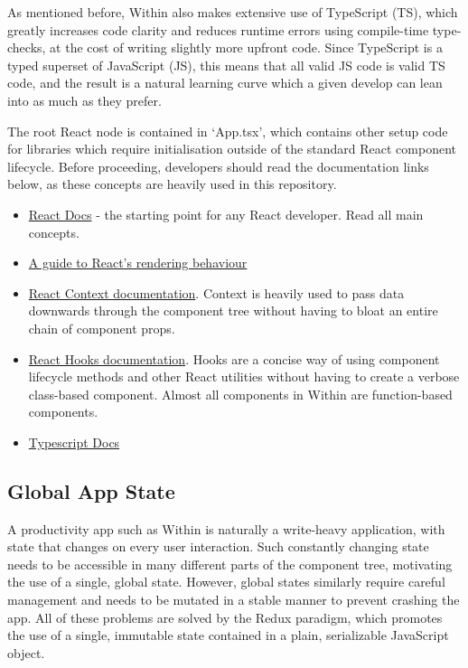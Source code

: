 As mentioned before, Within also makes extensive use of TypeScript (TS), which greatly increases code clarity and reduces runtime errors using compile-time type-checks, at the cost of writing slightly more upfront code. Since TypeScript is a typed superset of JavaScript (JS), this means that all valid JS code is valid TS code, and the result is a natural learning curve which a given develop can lean into as much as they prefer.

The root React node is contained in `App.tsx', which contains other setup code for libraries which require initialisation outside of the standard React component lifecycle. Before proceeding, developers should read the documentation links below, as these concepts are heavily used in this repository.

\begin{itemize}
    \item \href{https://reactjs.org/docs/hello-world.html}{React Docs} - the starting point for any React developer. Read all main concepts.
    \item \href{https://blog.isquaredsoftware.com/2020/05/blogged-answers-a-mostly-complete-guide-to-react-rendering-behavior/#rendering-process-overview}{A guide to React's rendering behaviour}
    \item \href{https://reactjs.org/docs/context.html}{React Context documentation}. Context is heavily used to pass data downwards through the component tree without having to bloat an entire chain of component props.
    \item \href{https://reactjs.org/docs/hooks-intro.html}{React Hooks documentation}. Hooks are a concise way of using component lifecycle methods and other React utilities without having to create a verbose class-based component. Almost all components in Within are function-based components.
    \item \href{https://www.typescriptlang.org/docs/}{Typescript Docs}
\end{itemize}

\subsection{Global App State}
A productivity app such as Within is naturally a write-heavy application, with state that changes on every user interaction. Such constantly changing state needs to be accessible in many different parts of the component tree, motivating the use of a single, global state. However, global states similarly require careful management and needs to be mutated in a stable manner to prevent crashing the app. All of these problems are solved by the Redux paradigm, which promotes the use of a single, immutable state contained in a plain, serializable JavaScript object.

